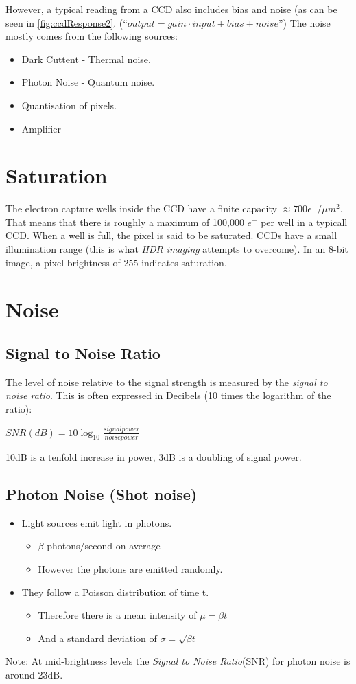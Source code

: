 \documentclass{article}
\begin{document}
However, a typical reading from a CCD also includes bias and noise (as can be seen in \ref{fig:ccdResponse2}.
(``$output = gain \cdot input + bias + noise$'')
The noise mostly comes from the following sources:
\begin{itemize}
	\item Dark Cuttent - Thermal noise.
	\item Photon Noise - Quantum noise.
	\item Quantisation of pixels.
	\item Amplifier
\end{itemize}
\newpage
\section{Saturation}
The electron capture wells inside the CCD have a finite capacity $\approx 700 \epsilon ^-/\mu m^2$.
That means that there is roughly a maximum of 100,000 $e^-$ per well in a typicall CCD.
When a well is full, the pixel is said to be saturated.
CCDs have a small illumination range (this is what {\it HDR imaging} attempts to overcome).
In an 8-bit image, a pixel brightness of 255 indicates saturation.
\section{Noise}
\subsection{Signal to Noise Ratio}
The level of noise relative to the signal strength is measured by the {\it signal to noise ratio}. This is often expressed in Decibels (10 times the logarithm of the ratio):

\centerline{$SNR (dB) = 10\log _{10}\frac{signal power}{noise power}$}

10dB is a tenfold increase in power, 3dB is a doubling of signal power.

\subsection{Photon Noise (Shot noise)}
\begin{itemize}
	\item Light sources emit light in photons.
		\begin{itemize}
			\item $\beta$ photons/second on average 
			\item However the photons are emitted randomly.
		\end{itemize}
	\item They follow a Poisson distribution of time t.
		\begin{itemize}
			\item Therefore there is a mean intensity of $\mu = \beta t$
			\item And a standard deviation of $\sigma = \sqrt{\beta t}$
		\end{itemize}
\end{itemize}
Note: At mid-brightness levels the {\it Signal to Noise Ratio}(SNR) for photon noise is around 23dB.
\end{document}
